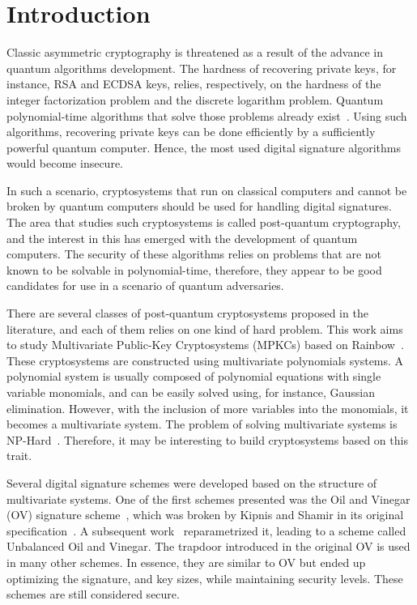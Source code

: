 \documentclass{ufsctex/ufsctex}
\makeatletter
\renewcommand{\listadeabreviaturas}{
	\pretextualchapter{List of Acronyms}\@starttoc{las}}
\makeatother
\begin{document}
\capa{}
\pretextuais{}
\listadefiguras{}
\listadetabelas{}
\listadeabreviaturas{}
\sumario{}

\chapter{Introduction}

Classic asymmetric cryptography is threatened as a result of the advance in
quantum algorithms development. The hardness of recovering private keys, for
instance, RSA and ECDSA keys, relies, respectively, on the hardness
of the integer factorization problem and the discrete logarithm problem.
Quantum polynomial-time algorithms that solve those problems already
exist~\cite{shor1999polynomial}. Using such algorithms, recovering private keys
can be done efficiently by a sufficiently powerful quantum computer. Hence, the
most used digital signature algorithms would become insecure.

In such a scenario, cryptosystems that run on classical computers and cannot be
broken by quantum computers should be used for handling digital signatures. The
area that studies such cryptosystems is called post-quantum cryptography, and
the interest in this has emerged with the development of quantum computers. The
security of these algorithms relies on problems that are not known to be
solvable in polynomial-time, therefore, they appear to be good candidates for
use in a scenario of quantum adversaries.

There are several classes of post-quantum cryptosystems proposed in the
literature, and each of them relies on one kind of hard problem. This work aims
to study Multivariate Public-Key Cryptosystems
(MPKCs) based on
Rainbow~\cite{ding2005rainbow}. These cryptosystems are constructed using
multivariate polynomials systems. A polynomial system is usually composed of
polynomial equations with single variable monomials, and can be easily solved
using, for instance, Gaussian elimination. However, with the inclusion of more
variables into the monomials, it becomes a multivariate system. The problem of
solving multivariate systems is NP-Hard~\cite{garey1979npc}. Therefore, it may
be interesting to build cryptosystems based on this trait.

Several digital signature schemes were developed based on the structure of
multivariate systems. One of the first schemes presented was the Oil and
Vinegar (OV) signature scheme~\cite{patarin1997ov},
which was broken by Kipnis and Shamir in its original
specification~\cite{kipnis1998cryptanalysis}. A subsequent
work~\cite{kipnis1999unbalanced} reparametrized it, leading to a scheme called
Unbalanced Oil and Vinegar. The trapdoor
introduced in the original OV is used in many other schemes. In essence, they
are similar to OV but ended up optimizing the signature, and key sizes, while
maintaining security levels. These schemes are still considered secure.
\end{document}
